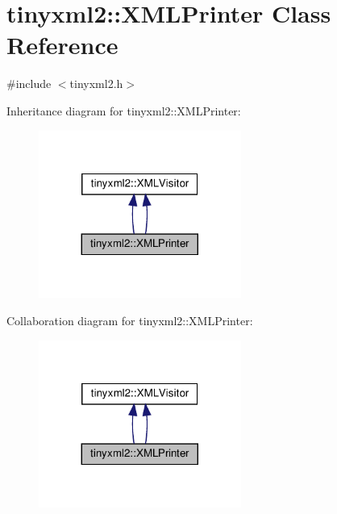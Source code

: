 \hypertarget{classtinyxml2_1_1XMLPrinter}{}\section{tinyxml2\+:\+:X\+M\+L\+Printer Class Reference}
\label{classtinyxml2_1_1XMLPrinter}


{\ttfamily \#include $<$tinyxml2.\+h$>$}



Inheritance diagram for tinyxml2\+:\+:X\+M\+L\+Printer\+:
\nopagebreak
\begin{figure}[H]
\begin{center}
\leavevmode
\includegraphics[width=188pt]{classtinyxml2_1_1XMLPrinter__inherit__graph}
\end{center}
\end{figure}


Collaboration diagram for tinyxml2\+:\+:X\+M\+L\+Printer\+:
\nopagebreak
\begin{figure}[H]
\begin{center}
\leavevmode
\includegraphics[width=188pt]{classtinyxml2_1_1XMLPrinter__coll__graph}
\end{center}
\end{figure}
